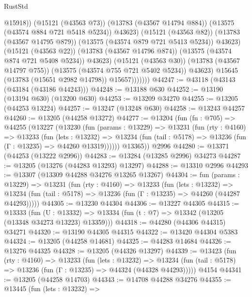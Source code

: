 \begin{lexlean}{RustStd}
\begin{coremodule}
                              @15918))
                          (@15121 (@43563 @73))
                          (@13783 (@43567 @14794 @884))
                          (@13575 (@43574 @884 @721 @5418 @5234))
                          @43623)
                        (@15121 (@43563 @82))
                        (@13783 (@43567 @14795 @879))
                        (@13575 (@43574 @879 @721 @5413 @5234))
                        @43623)
                      (@15121 (@43563 @22))
                      (@13783 (@43567 @14796 @874))
                      (@13575 (@43574 @874 @721 @5408 @5234))
                      @43623)
                    (@15121 (@43563 @30))
                    (@13783 (@43567 @14797 @755))
                    (@13575 (@43574 @755 @721 @5402 @5234))
                    @43623)
                  @15645
                  (@13783 (@15651 @2982 @14798))
                  @15657)))))))
@44247 := @43118 (@43143 (@43184 (@43186 @44243)))
@44248 := @13188 @630
@44252 := @13190 (@13194 @630) (@13200 @630)
@44253 := @13209 @34270
@44255 := @13205 (@44253 @13224)
@44257 := @13247 (@13248 @630)
@44258 := @13243 @44257
@44260 := @13205 (@44258 @13272)
@44277 := @13204
    (fun (fn : @705) =>
    @44255
      (@13227
        (@13230
          (fun (params : @13229) =>
          @13231
            (fun (rty : @4160) =>
            @13233
              (fun (lets : @13232) =>
              @13234 (fun (tail : @5178) => @13236 (fun (Γ : @13235) => @44260 @13319))))))
        @13365))
    @2996
@44280 := @13371 (@44253 (@13222 @2996))
@44283 := @13284 (@13285 @2996) @34273
@44287 := @13205 (@13276 (@44283 @13293) @13297)
@44288 := @13310 @2996
@44293 := @13307 (@13309 @44288 @34276 @13265 @13267)
@44304 := fun (params : @13229) =>
  @13231
    (fun (rty : @4160) =>
    @13233
      (fun (lets : @13232) =>
      @13234 (fun (tail : @5178) => @13236 (fun (Γ : @13235) => @44260 (@44287 @44293)))))
@44305 := @13230 @44304
@44306 := @13227 @44305
@44315 := @13333
    (fun (U : @13332) => @13334 (fun (t : @7) => @13342 (@13205 (@13348 @34273 @13223) @13359)))
@44318 := @44280 (@44306 @44315) @34271
@44320 := @13190 @44305 @44315
@44322 := @13420 @44304 @5383
@44324 := @13205 (@44258 @14681)
@44325 := @44283 @14684
@44326 := @13276 @44325
@44328 := @13205 (@44326 @13297)
@44339 := @13423
    (fun (rty : @4160) =>
    @13233
      (fun (lets : @13232) =>
      @13234 (fun (tail : @5178) => @13236 (fun (Γ : @13235) => @44324 (@44328 @44293)))))
    @4154
@44341 := @13205 (@44258 @14703)
@44343 := @14708 @44288 @34276
@44355 := @13445
    (fun (lets : @13232) =>

\end{coremodule}
\end{lexlean}
